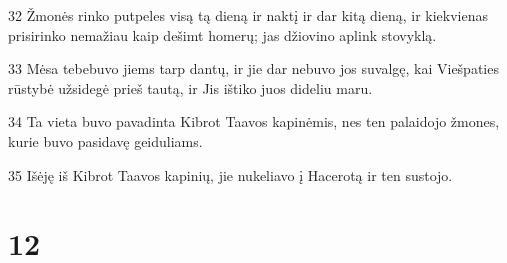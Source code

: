 \par 32 Žmonės rinko putpeles visą tą dieną ir naktį ir dar kitą dieną, ir kiekvienas prisirinko nemažiau kaip dešimt homerų; jas džiovino aplink stovyklą. 
\par 33 Mėsa tebebuvo jiems tarp dantų, ir jie dar nebuvo jos suvalgę, kai Viešpaties rūstybė užsidegė prieš tautą, ir Jis ištiko juos dideliu maru. 
\par 34 Ta vieta buvo pavadinta Kibrot Taavos kapinėmis, nes ten palaidojo žmones, kurie buvo pasidavę geiduliams. 
\par 35 Išėję iš Kibrot Taavos kapinių, jie nukeliavo į Hacerotą ir ten sustojo.



\chapter{12}


